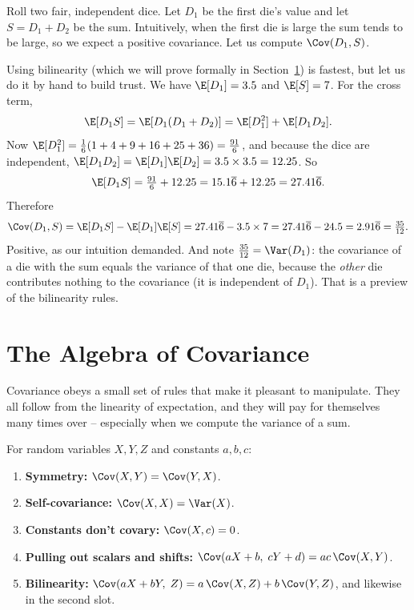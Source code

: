 \begin{example}
\label{ch14:ex-dice}
Roll two fair, independent dice. Let $D_1$ be the first die's value and let
$S = D_1 + D_2$ be the sum. Intuitively, when the first die is large the sum tends
to be large, so we expect a positive covariance. Let us compute $\Cov(D_1, S)$.

Using bilinearity (which we will prove formally in
Section~\ref{ch14:properties}) is fastest, but let us do it by hand to build
trust. We have $\E[D_1] = 3.5$ and $\E[S] = 7$. For the cross term,
\[
\E[D_1 S] = \E[D_1(D_1 + D_2)] = \E[D_1^2] + \E[D_1 D_2].
\]
Now $\E[D_1^2] = \tfrac{1}{6}(1 + 4 + 9 + 16 + 25 + 36) = \tfrac{91}{6}$, and
because the dice are independent, $\E[D_1 D_2] = \E[D_1]\E[D_2] = 3.5 \times 3.5
= 12.25$. So
\[
\E[D_1 S] = \tfrac{91}{6} + 12.25 = 15.1\overline{6} + 12.25 = 27.41\overline{6}.
\]
Therefore
\[
\Cov(D_1, S) = \E[D_1 S] - \E[D_1]\E[S]
= 27.41\overline{6} - 3.5 \times 7
= 27.41\overline{6} - 24.5 = 2.91\overline{6} = \tfrac{35}{12}.
\]
Positive, as our intuition demanded. And note $\tfrac{35}{12} = \Var(D_1)$: the
covariance of a die with the sum equals the variance of that one die, because the
\emph{other} die contributes nothing to the covariance (it is independent of
$D_1$). That is a preview of the bilinearity rules.
\end{example}

\section{The Algebra of Covariance}
\label{ch14:properties}

Covariance obeys a small set of rules that make it pleasant to manipulate. They all
follow from the linearity of expectation, and they will pay for themselves many
times over -- especially when we compute the variance of a sum.

\begin{proposition}
\label{ch14:cov-props}
For random variables $X, Y, Z$ and constants $a, b, c$:
\begin{enumerate}
\item \textbf{Symmetry:} $\Cov(X, Y) = \Cov(Y, X)$.
\item \textbf{Self-covariance:} $\Cov(X, X) = \Var(X)$.
\item \textbf{Constants don't covary:} $\Cov(X, c) = 0$.
\item \textbf{Pulling out scalars and shifts:}
$\Cov(aX + b,\; cY + d) = ac\,\Cov(X, Y)$.
\item \textbf{Bilinearity:}
$\Cov(aX + bY,\; Z) = a\,\Cov(X, Z) + b\,\Cov(Y, Z)$,
and likewise in the second slot.
\end{enumerate}
\end{proposition}

